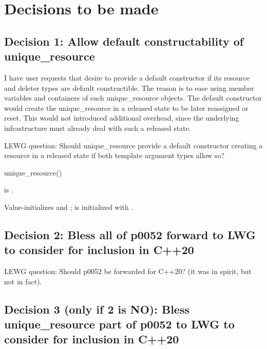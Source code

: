 \documentclass[ebook,11pt,article]{memoir}
\begin{document}
\chapter{Decisions to be made}

\section{Decision 1: Allow default constructability of unique_resource}
I have user requests that desire  to provide a default constructor if its resource and deleter types are default constructible. The reason is to ease using member variables and containers of such unique_resource objects. The default constructor would create the unique_resource in a released state to be later reassigned or reset. This would not introduced additional overhead, since the underlying infrastructure must already deal with such a released state.

LEWG question: Should unique_resource provide a default constructor creating a resource in a released state if both template argument types allow so?


\begin{addedblock}
\begin{itemdecl}
unique_resource()
\end{itemdecl}

\begin{itemdescr}
\pnum
\constraints
{} \tcode{\&\&}
 is .

\pnum
\effects
Value-initializes
 and ;  is initialized with .
\end{itemdescr}
\end{addedblock}



\section{Decision 2: Bless all of p0052 forward to LWG to consider for inclusion in C++20}

LEWG question: Should p0052 be forwarded for C++20? (it was in spirit, but not in fact).

\section{Decision 3 (only if 2 is NO): Bless unique_resource part of p0052 to LWG to consider for inclusion in C++20}
\end{document}
